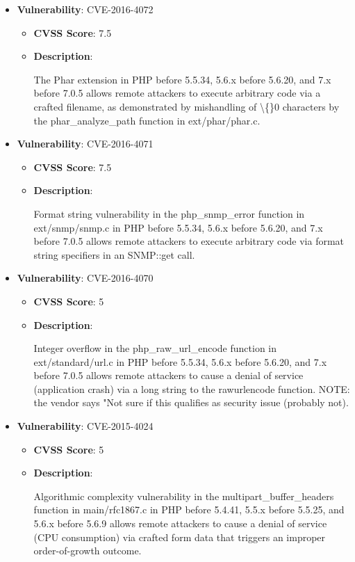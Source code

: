 \documentclass{article}
\begin{document}
\begin{itemize}
        \item \textbf{Vulnerability}: CVE-2016-4072
        \begin{itemize}
            \item \textbf{CVSS Score}:  7.5 
            \item \textbf{Description}:
            \parbox[t]{0.9\linewidth}{
                \ttfamily The Phar extension in PHP before 5.5.34, 5.6.x before 5.6.20, and 7.x before 7.0.5 allows remote attackers to execute arbitrary code via a crafted filename, as demonstrated by mishandling of \textbackslash\{\}0 characters by the phar\_analyze\_path function in ext/phar/phar.c.
            }
        \end{itemize}
    
        \item \textbf{Vulnerability}: CVE-2016-4071
        \begin{itemize}
            \item \textbf{CVSS Score}:  7.5 
            \item \textbf{Description}:
            \parbox[t]{0.9\linewidth}{
                \ttfamily Format string vulnerability in the php\_snmp\_error function in ext/snmp/snmp.c in PHP before 5.5.34, 5.6.x before 5.6.20, and 7.x before 7.0.5 allows remote attackers to execute arbitrary code via format string specifiers in an SNMP::get call.
            }
        \end{itemize}
    
        \item \textbf{Vulnerability}: CVE-2016-4070
        \begin{itemize}
            \item \textbf{CVSS Score}:  5 
            \item \textbf{Description}:
            \parbox[t]{0.9\linewidth}{
                \ttfamily Integer overflow in the php\_raw\_url\_encode function in ext/standard/url.c in PHP before 5.5.34, 5.6.x before 5.6.20, and 7.x before 7.0.5 allows remote attackers to cause a denial of service (application crash) via a long string to the rawurlencode function. NOTE: the vendor says "Not sure if this qualifies as security issue (probably not).
            }
        \end{itemize}
    
        \item \textbf{Vulnerability}: CVE-2015-4024
        \begin{itemize}
            \item \textbf{CVSS Score}:  5 
            \item \textbf{Description}:
            \parbox[t]{0.9\linewidth}{
                \ttfamily Algorithmic complexity vulnerability in the multipart\_buffer\_headers function in main/rfc1867.c in PHP before 5.4.41, 5.5.x before 5.5.25, and 5.6.x before 5.6.9 allows remote attackers to cause a denial of service (CPU consumption) via crafted form data that triggers an improper order-of-growth outcome.
            }
        \end{itemize}
    

\end{itemize}
\end{document}
